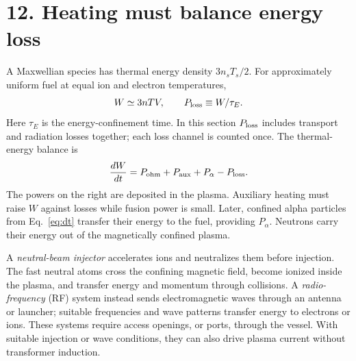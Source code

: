 \documentclass[11pt]{article}
\begin{document}

\section*{12. Heating must balance energy loss}
A Maxwellian species has thermal energy density $3n_sT_s/2$. For approximately uniform
fuel at equal ion and electron temperatures,
\begin{equation}
 W\simeq3nTV,\qquad P_{\rm loss}\equiv W/\tau_E.
 \label{eq:taue}
\end{equation}
Here $\tau_E$ is the energy-confinement time. In this section $P_{\rm loss}$ includes
transport and radiation losses together; each loss channel is counted once. The
thermal-energy balance is
\begin{equation}
 \frac{dW}{dt}=P_{\rm ohm}+P_{\rm aux}+P_\alpha-P_{\rm loss}.
 \label{eq:powerbalance}
\end{equation}
The powers on the right are deposited in the plasma. Auxiliary heating must raise
$W$ against losses while fusion power is small. Later, confined alpha particles
from Eq.~\eqref{eq:dt} transfer their energy to the fuel, providing $P_\alpha$.
Neutrons carry their energy out of the magnetically confined plasma.

A \emph{neutral-beam injector} accelerates ions and neutralizes them before injection.
The fast neutral atoms cross the confining magnetic field, become ionized inside the
plasma, and transfer energy and momentum through collisions. A \emph{radio-frequency}
(RF) system instead sends electromagnetic waves through an antenna or launcher; suitable
frequencies and wave patterns transfer energy to electrons or ions. These systems
require access openings, or ports, through the vessel. With suitable injection or
wave conditions, they can also drive plasma current without transformer induction.
\end{document}
